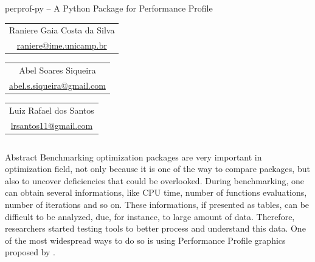 \documentclass[]{beamer}
\begin{document}
\begin{frame}[t,fragile]
  \begin{center}
    \begin{huge}
      perprof-py -- A Python Package for Performance Profile 
    \end{huge}

    \vspace{40pt}
    \begin{Large}
      \begin{tabular}[]{c}
        Raniere Gaia Costa da Silva \\
        \url{raniere@ime.unicamp.br}
      \end{tabular} \hspace{5cm}
      \begin{tabular}[]{c}
        Abel Soares Siqueira \\
        \url{abel.s.siqueira@gmail.com}
      \end{tabular} \hspace{5cm}
      \begin{tabular}[]{c}
        Luiz Rafael dos Santos \\
        \url{lrsantos11@gmail.com}
      \end{tabular}
    \end{Large}
  \end{center}
  \vspace{40pt}

  \begin{columns}[t]
    \begin{column}{0.4\textwidth}
      \begin{block}{Abstract}
        Benchmarking optimization packages are very important in optimization
        field, not only because it is one of the way to compare packages, but also
        to uncover deficiencies that could be overlooked. During benchmarking, one
        can obtain several informations, like CPU time, number of functions
        evaluations, number of iterations and so on. These informations, if
        presented as tables, can be difficult to be analyzed, due, for instance,
        to large amount of data. Therefore, researchers started testing tools to
        better process and understand this data.  One of the most widespread ways
        to do so is using Performance Profile graphics proposed by
        \citeauthor{Dolan2001}.


\end{block}
\end{column}
\end{columns}
\end{frame}
\end{document}
